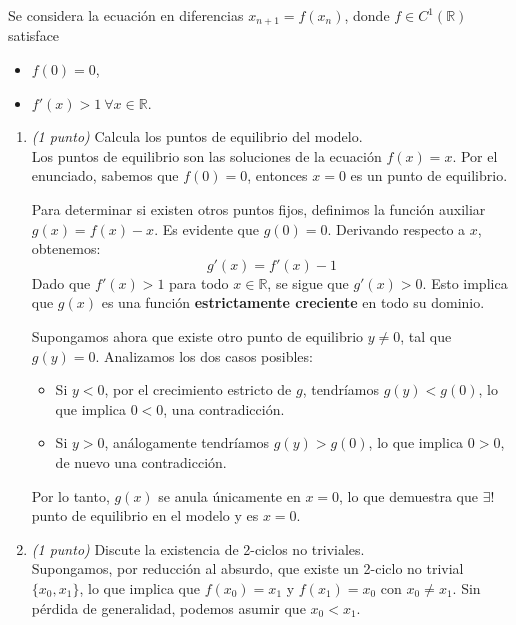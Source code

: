 \documentclass[12pt]{article}
\begin{document}
    \begin{ejercicio}
        Se considera la ecuación en diferencias $x_{n+1} = f(x_n)$, donde $f \in C^1(\mathbb{R})$ satisface
        \begin{itemize}
            \item $f(0) = 0$,
            \item $f'(x) > 1 \ \forall x \in \mathbb{R}$.
        \end{itemize}
        
        \begin{enumerate}
            \item \emph{(1 punto)} Calcula los puntos de equilibrio del modelo. \\
                Los puntos de equilibrio son las soluciones de la ecuación $f(x) = x$. Por el enunciado, sabemos que $f(0) = 0$, entonces $x = 0$ es un punto de equilibrio. 
    
                Para determinar si existen otros puntos fijos, definimos la función auxiliar $g(x) = f(x) - x$. Es evidente que $g(0) = 0$. Derivando respecto a $x$, obtenemos:
                $$g'(x) = f'(x) - 1$$
                Dado que $f'(x) > 1$ para todo $x \in \mathbb{R}$, se sigue que $g'(x) > 0$. Esto implica que $g(x)$ es una función \textbf{estrictamente creciente} en todo su dominio.
                
                Supongamos ahora que existe otro punto de equilibrio $y \neq 0$, tal que $g(y) = 0$. Analizamos los dos casos posibles:
                \begin{itemize}
                    \item Si $y < 0$, por el crecimiento estricto de $g$, tendríamos $g(y) < g(0)$, lo que implica $0 < 0$, una contradicción.
                    \item Si $y > 0$, análogamente tendríamos $g(y) > g(0)$, lo que implica $0 > 0$, de nuevo una contradicción.
                \end{itemize}
                
                Por lo tanto, $g(x)$ se anula únicamente en $x = 0$, lo que demuestra que $\exists!$ punto de equilibrio en el modelo y es $x = 0$.
                
            \item \emph{(1 punto)} Discute la existencia de 2-ciclos no triviales. \\
                Supongamos, por reducción al absurdo, que existe un 2-ciclo no trivial $\{x_0, x_1\}$, lo que implica que $f(x_0) = x_1$ y $f(x_1) = x_0$ con $x_0 \neq x_1$. Sin pérdida de generalidad, podemos asumir que $x_0 < x_1$.
    

\end{enumerate}
\end{ejercicio}
\end{document}
